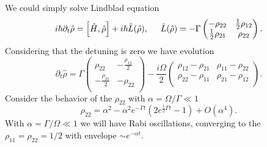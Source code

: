 We could simply solve Lindblad equation
\begin{equation}
	i \hbar \partial_t \hat{\rho} = \left[\hat{H}, \hat{\rho}\right] + i \hbar \hat{L}(\hat{\rho}),
	\hspace{5 mm} 
	\hat{L}(\hat{\rho}) = -\Gamma \begin{pmatrix}
	    -\rho_{22} & \tfrac{1}{2}\rho_{12} \\
	    \tfrac{1}{2}\rho_{21}& \rho_{22} \\
	\end{pmatrix}.
	\label{leq}
\end{equation}
Considering that the detuning is zero we have evolution 
\begin{equation*}
	\partial_t \hat{\rho} = \Gamma \left(
\begin{array}{cc}
 \rho _{22} & -\tfrac{\rho _{12}}{2} \\
 -\tfrac{\rho _{21}}{2} & -\rho _{22} \\
\end{array}
\right) - \frac{i \Omega}{2} \left(
\begin{array}{cc}
 \rho _{12}-\rho _{21} & \rho _{11}-\rho _{22} \\
 \rho _{22}-\rho _{11} & \rho _{21}-\rho _{12} \\
\end{array}
\right).
\end{equation*}
Consider the behavior of the $\rho_{22}$
  with $\alpha = \Omega / \Gamma \ll 1$
\begin{equation*}
	\rho_{22} = \alpha^2 - \alpha ^2 e^{-\Gamma t} \left(2 e^{\frac{1}{2}\Gamma  t}-1\right) + O(\alpha^4).
\end{equation*}
With $\alpha = \Gamma / \Omega \ll 1$ we will have Rabi oscillations, converging to the $\rho_{11} = \rho_{22} = 1/2$ with envelope $\sim e^{-\alpha t}$.